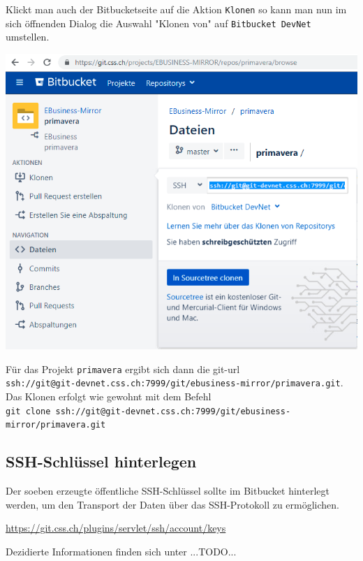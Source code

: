 \documentclass[]{article}
\newcommand{\code}[1]{\texttt{#1}}
\begin{document}
Klickt man auch der Bitbucketseite auf die Aktion \code{Klonen} so kann man nun im sich öffnenden Dialog die Auswahl "Klonen von" auf \code{Bitbucket DevNet} umstellen.

\includegraphics[scale=0.3]{assets/clone.png}

Für das Projekt \code{primavera} ergibt sich dann die git-url \\
\code{ssh://git@git-devnet.css.ch:7999/git/ebusiness-mirror/primavera.git}. Das Klonen erfolgt wie gewohnt mit dem Befehl \\
\code{git clone ssh://git@git-devnet.css.ch:7999/git/ebusiness-mirror/primavera.git}

\subsection{SSH-Schlüssel hinterlegen}
Der soeben erzeugte öffentliche SSH-Schlüssel sollte im Bitbucket hinterlegt werden, um den Transport der Daten über das SSH-Protokoll zu ermöglichen.

\href{https://git.css.ch/plugins/servlet/ssh/account/keys}{https://git.css.ch/plugins/servlet/ssh/account/keys}

Dezidierte Informationen finden sich unter ...TODO...
\end{document}
